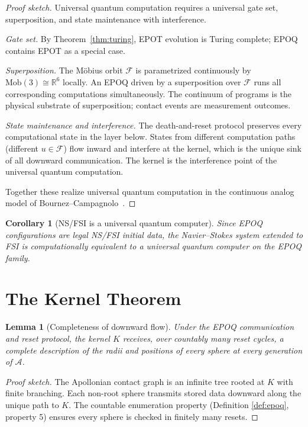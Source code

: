 \documentclass[11pt]{article}
\theoremstyle{plain}
\newtheorem{lemma}[theorem]{Lemma}
\newtheorem{corollary}[theorem]{Corollary}
\theoremstyle{definition}
\theoremstyle{remark}
\begin{document}
\begin{proof}[Proof sketch]
Universal quantum computation requires a universal gate set, superposition,
and state maintenance with interference.

\textit{Gate set.} By Theorem~\ref{thm:turing}, EPOT evolution is Turing
complete; EPOQ contains EPOT as a special case.

\textit{Superposition.} The M\"{o}bius orbit $\mathcal{F}$ is parametrized
continuously by $\mathrm{Mob}(3) \cong \mathbb{R}^6$ locally. An EPOQ
driven by a superposition over $\mathcal{F}$ runs all corresponding
computations simultaneously. The continuum of programs is the physical
substrate of superposition; contact events are measurement outcomes.

\textit{State maintenance and interference.} The death-and-reset protocol
preserves every computational state in the layer below. States from
different computation paths (different $u \in \mathcal{F}$) flow inward
and interfere at the kernel, which is the unique sink of all downward
communication. The kernel is the interference point of the universal quantum
computation.

Together these realize universal quantum computation in the continuous
analog model of Bournez--Campagnolo~\cite{Bournez2006}.
\end{proof}

\begin{corollary}[NS/FSI is a universal quantum computer]
Since EPOQ configurations are legal NS/FSI initial data, the Navier--Stokes
system extended to FSI is computationally equivalent to a universal quantum
computer on the EPOQ family.
\end{corollary}

\section{The Kernel Theorem}
\label{sec:kernel}

\begin{lemma}[Completeness of downward flow]
\label{lem:flow}
Under the EPOQ communication and reset protocol, the kernel $K$ receives,
over countably many reset cycles, a complete description of the radii and
positions of every sphere at every generation of $\mathcal{A}$.
\end{lemma}

\begin{proof}[Proof sketch]
The Apollonian contact graph is an infinite tree rooted at $K$ with finite
branching. Each non-root sphere transmits stored data downward along the
unique path to $K$. The countable enumeration property (Definition
\ref{def:epoq}, property 5) ensures every sphere is checked in finitely
many resets.
\end{proof}
\end{document}
